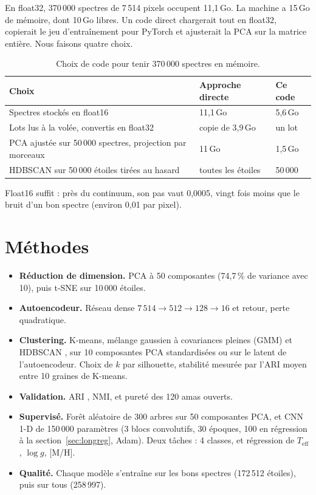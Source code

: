 \documentclass[11pt,a4paper]{article}
\newcommand{\logg}{$\log g$}
\newcommand{\teff}{$T_{\mathrm{eff}}$}
\newcommand{\mh}{[M/H]}
\begin{document}
En float32, 370\,000 spectres de 7\,514 pixels occupent 11,1\,Go. La machine a 15\,Go de mémoire, dont 10\,Go libres. Un code direct chargerait tout en float32, copierait le jeu d'entraînement pour PyTorch et ajusterait la PCA sur la matrice entière. Nous faisons quatre choix.

\begin{table}[H]
\centering
\begin{tabular}{lll}
\toprule
Choix & Approche directe & Ce code \\
\midrule
Spectres stockés en float16 & 11,1\,Go & 5,6\,Go \\
Lots lus à la volée, convertis en float32 & copie de 3,9\,Go & un lot \\
PCA ajustée sur 50\,000 spectres, projection par morceaux & 11\,Go & 1,5\,Go \\
HDBSCAN sur 50\,000 étoiles tirées au hasard & toutes les étoiles & 50\,000 \\
\bottomrule
\end{tabular}
\caption{Choix de code pour tenir 370\,000 spectres en mémoire.}
\end{table}

Float16 suffit : près du continuum, son pas vaut 0,0005, vingt fois moins que le bruit d'un bon spectre (environ 0,01 par pixel).

\section{Méthodes}

\begin{itemize}
  \item \textbf{Réduction de dimension.} PCA à 50 composantes (74,7\,\% de variance avec 10), puis t-SNE \cite{tsne} sur 10\,000 étoiles.
  \item \textbf{Autoencodeur.} Réseau dense $7\,514 \to 512 \to 128 \to 16$ et retour, perte quadratique.
  \item \textbf{Clustering.} K-means, mélange gaussien à covariances pleines (GMM) et HDBSCAN \cite{hdbscan}, sur 10 composantes PCA standardisées ou sur le latent de l'autoencodeur. Choix de $k$ par silhouette, stabilité mesurée par l'ARI moyen entre 10 graines de K-means.
  \item \textbf{Validation.} ARI \cite{ari}, NMI, et pureté des 120 amas ouverts.
  \item \textbf{Supervisé.} Forêt aléatoire de 300 arbres sur 50 composantes PCA, et CNN 1-D de 150\,000 paramètres (3 blocs convolutifs, 30 époques, 100 en régression à la section~\ref{sec:longreg}, Adam). Deux tâches : 4 classes, et régression de \teff{}, \logg{}, \mh{}.
  \item \textbf{Qualité.} Chaque modèle s'entraîne sur les bons spectres (172\,512 étoiles), puis sur tous (258\,997).
\end{itemize}
\end{document}
